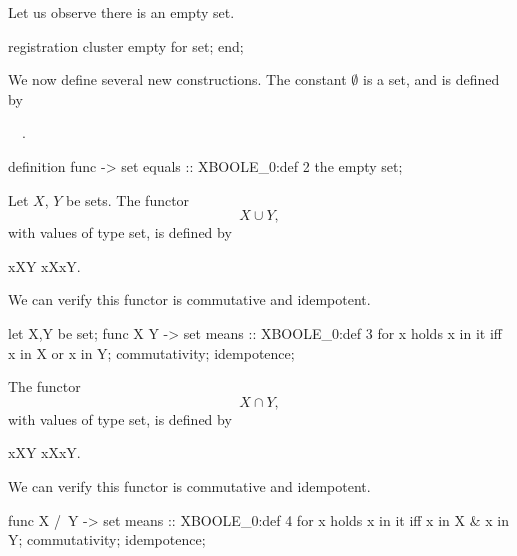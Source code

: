 \begin{paracol}{2}
\switchcolumn*\ensurevspace{5cm}

\noindent Let us observe there is an empty set.

\switchcolumn

\begin{mizar}
registration
  cluster empty for set;
end;
\end{mizar}

\switchcolumn*\ensurevspace{5cm}

We now define several new constructions. The constant\index{$\emptyset$} $\emptyset$ is a set, and is
defined by
\begin{definition}
\emptyset\is\ \THE {}\ .
\end{definition}

\switchcolumn

\begin{mizar}
definition
  func {} -> set
  equals :: XBOOLE_0:def 2
  the empty set;
\end{mizar}

\switchcolumn*\ensurevspace{5cm}\noindent%
Let $X$, $Y$ be sets. The functor
\[ X\cup Y,\]
with values of type set, is defined by
\begin{definition}
x\in X\cup Y \iff x\in X\lor x\in Y. 
\end{definition}
We can verify this functor is commutative and idempotent.

\switchcolumn

\begin{mizar}
  let X,Y be set;
  func X \/ Y -> set
  means :: XBOOLE_0:def 3
  for x holds x in it
  iff x in X or x in Y;
  commutativity;
  idempotence;
\end{mizar}

\switchcolumn*\ensurevspace{5cm}\sloppy\noindent%
The functor
\[ X\cap Y,\]
with values of type set, is defined by
\begin{definition}
x\in X\cap Y \iff x\in X\land x\in Y.
\end{definition}
We can verify this functor is commutative and idempotent.

\switchcolumn

\begin{mizar}
  func X /\ Y -> set
  means :: XBOOLE_0:def 4
  for x holds x in it
  iff x in X & x in Y;
  commutativity;
  idempotence;
\end{mizar}


\end{paracol}
